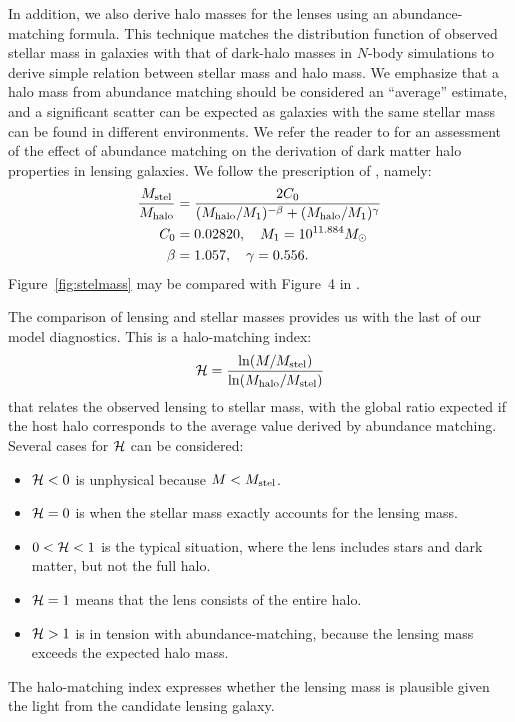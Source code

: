 In addition, we also derive halo masses for the lenses using an
abundance-matching formula.  This technique matches the distribution
function of observed stellar mass in galaxies with that of dark-halo
masses in $N$-body simulations to derive simple relation between
stellar mass and halo mass.  We emphasize that a halo mass from
abundance matching should be considered an ``average'' estimate, and a
significant scatter can be expected as galaxies with the same stellar
mass can be found in different environments. We refer the reader to
\cite{2012MNRAS.424..104L} for an assessment of the effect of
abundance matching on the derivation of dark matter halo properties in
lensing galaxies. We follow the prescription of
\citet{2010ApJ...710..903M}, namely:
\begin{equation}
\begin{aligned}
\frac{M_\text{stel}}{M_\text{halo}} &= \frac{2C_0}{(M_\text{halo}/M_1)^{-\beta} +
                                     (M_\text{halo}/M_1)^\gamma} \\
C_0 &= 0.02820, \quad M_1 = 10^{11.884} M_\odot \\
\beta &= 1.057, \quad \gamma = 0.556.
\end{aligned}
\end{equation}
Figure~\ref{fig:stelmass} may be compared with Figure~4 in
\cite{2011ApJ...734...69M}.

The comparison of lensing and stellar masses provides us with the last
of our model diagnostics.  This is a halo-matching index:
\begin{equation}
\mathcal{H} = \frac{\ln(M/M_\text{stel})}{\ln(M_\text{halo}/M_\text{stel})}
\end{equation}
that relates the observed lensing to stellar mass, with the
global ratio expected if the host halo corresponds to the
average value derived by abundance matching. Several cases
for $\mathcal{H}$ can be considered:
\begin{itemize}
\item $\mathcal{H} < 0$ is unphysical because $M<M_\text{stel}$.
\item $\mathcal{H} = 0$ is when the stellar mass exactly accounts for the
  lensing mass.
\item $0 < \mathcal{H} < 1$ is the typical situation, where the lens
  includes stars and dark matter, but not the full halo.
\item $\mathcal{H} = 1$ means that the lens consists of the entire halo.
\item $\mathcal{H} > 1$ is in tension with abundance-matching, because the
  lensing mass exceeds the expected halo mass.
\end{itemize}
The halo-matching index expresses whether the lensing mass is
plausible given the light from the candidate lensing galaxy.



